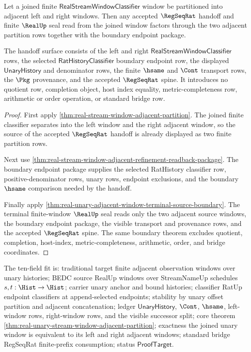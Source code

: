 \begin{theorem}
\label{thm:real-stream-window-regseqrat-partition-handoff}
Let a joined finite $\mathsf{RealStreamWindowClassifier}$ window be partitioned
into adjacent left and right windows. Then any accepted $\RegSeqRat$ handoff
and finite $\RealUp$ seal read from the joined window factors through the two
adjacent partition rows together with the boundary endpoint package.

The handoff surface consists of the left and right
$\mathsf{RealStreamWindowClassifier}$ rows, the selected
$\mathsf{RatHistoryClassifier}$ boundary endpoint row, the displayed
$\mathsf{UnaryHistory}$ and denominator rows, the finite $\hsame$ and $\Cont$
transport rows, the $\Pkg$ provenance, and the accepted $\RegSeqRat$ spine. It
introduces no quotient row, completion object, host index equality,
metric-completeness row, arithmetic or order operation, or standard bridge row.
\end{theorem}
\begin{proof}
First apply \autoref{thm:real-stream-window-adjacent-partition}. The joined
finite classifier separates into the left window and the right adjacent window,
so the source of the accepted $\RegSeqRat$ handoff is already displayed as two
finite partition rows.

Next use
\autoref{thm:real-stream-window-adjacent-refinement-readback-package}. The
boundary endpoint package supplies the selected RatHistory classifier row,
positive-denominator rows, unary rows, endpoint exclusions, and the boundary
$\hsame$ comparison needed by the handoff.

Finally apply
\autoref{thm:real-unary-adjacent-window-terminal-source-boundary}. The terminal
finite-window $\RealUp$ seal reads only the two adjacent source windows, the
boundary endpoint package, the visible transport and provenance rows, and the
accepted $\RegSeqRat$ spine. The same boundary theorem excludes quotient,
completion, host-index, metric-completeness, arithmetic, order, and bridge
coordinates.
\end{proof}

The ten-field fit is: traditional target finite adjacent observation windows
over unary histories; BEDC source RealUp windows over StreamNameUp schedules
$s,t:\Hist\to\Hist$; carrier unary anchor and bound histories; classifier
RatUp endpoint classifiers at append-selected endpoints; stability by unary
offset partition and adjacent concatenation; ledger $\mathsf{UnaryHistory}$,
$\Cont$, $\hsame$, left-window rows, right-window rows, and the visible
successor split; core theorem
\autoref{thm:real-unary-stream-window-adjacent-partition}; exactness the
joined unary window is equivalent to its left and right adjacent windows;
standard bridge RegSeqRat finite-prefix consumption; status
$\mathsf{ProofTarget}$.

